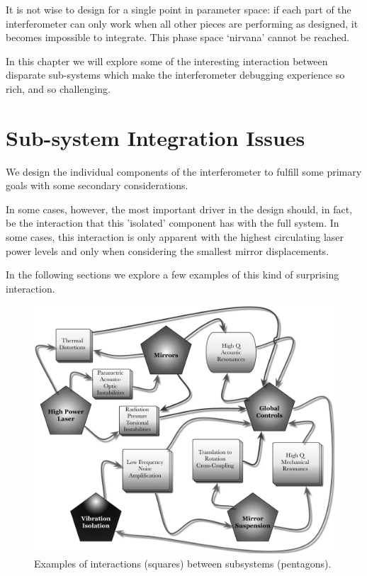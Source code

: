 It is not wise to design for a single point in parameter space: if each
part of the interferometer can only work when all other pieces are
performing as designed, it becomes impossible to integrate. This phase
space `nirvana' cannot be reached.

In this chapter we will explore some of the interesting interaction between
disparate sub-systems which make the interferometer debugging experience
so rich, and so challenging.


\section{Sub-system Integration Issues}
We design the individual components of the interferometer to fulfill some
primary goals with some secondary considerations.

In some cases, however, the most important driver in the design should, in fact, be the interaction that this 'isolated' component has with the full system. In some cases, this interaction is only apparent with the highest circulating laser power levels and only when considering the smallest mirror displacements.

In the following sections we explore a few examples of this kind of surprising
interaction.


\begin{figure}[h]
\centering
\includegraphics[width=\columnwidth]{Figures/SystemConflicts-BW.pdf}
\caption{Examples of interactions (squares) between subsystems (pentagons).}
\label{fig:SystemConflicts}
\end{figure}

